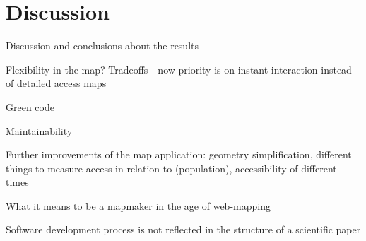 \section{Discussion}

Discussion and conclusions about the results

Flexibility in the map? Tradeoffs - now priority is on instant interaction instead of detailed access maps

Green code

Maintainability

Further improvements of the map application:
geometry simplification,
different things to measure access in relation to (population),
accessibility of different times

What it means to be a mapmaker in the age of web-mapping

Software development process is not reflected in the structure of a scientific paper
